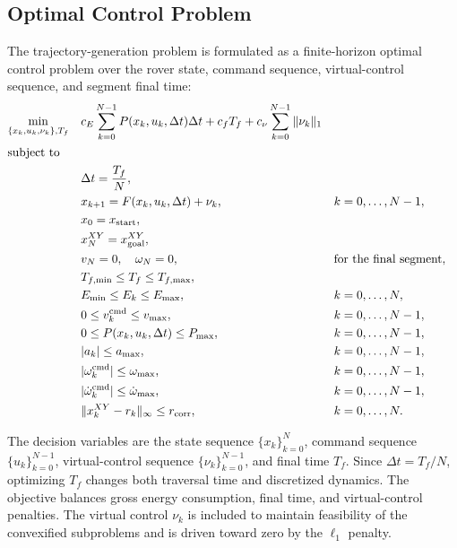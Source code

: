 \documentclass[conf]{new-aiaa}
\begin{document}
\subsection{Optimal Control Problem}
The trajectory-generation problem is formulated as a finite-horizon optimal control problem over the rover state, command sequence, virtual-control sequence, and segment final time:
\begin{subequations}\label{eq:ocp}
\begin{align}
\min_{\{x_k,u_k,\nu_k\},T_f}\quad
& c_E\sum_{k=0}^{N-1} P(x_k,u_k,\Delta t)\Delta t
 + c_f T_f
 + c_\nu\sum_{k=0}^{N-1}\|\nu_k\|_1
\label{eq:ocp_objective}\\
\intertext{subject to}
& \Delta t = \frac{T_f}{N},
\label{eq:ocp_dt}\\
& x_{k+1}=F(x_k,u_k,\Delta t)+\nu_k, && k=0,\ldots,N-1,
\label{eq:ocp_dynamics}\\
& x_0=x_{\mathrm{start}},
\label{eq:ocp_start}\\
& x_N^{XY}=x_{\mathrm{goal}}^{XY},
\label{eq:ocp_goal}\\
& v_N=0,\quad \omega_N=0, && \text{for the final segment},
\label{eq:ocp_stop}\\
& T_{f,\min}\leq T_f\leq T_{f,\max},
\label{eq:ocp_time_bounds}\\
& E_{\min}\leq E_k\leq E_{\max}, && k=0,\ldots,N,
\label{eq:ocp_energy_bounds}\\
& 0\leq v_k^{\mathrm{cmd}}\leq v_{\max}, && k=0,\ldots,N-1,
\label{eq:ocp_speed_bounds}\\
& 0\leq P(x_k,u_k,\Delta t)\leq P_{\max}, && k=0,\ldots,N-1,
\label{eq:ocp_power_bounds}\\
& |a_k|\leq a_{\max}, && k=0,\ldots,N-1,
\label{eq:ocp_accel_bound}\\
& |\omega_k^{\mathrm{cmd}}|\leq \omega_{\max}, && k=0,\ldots,N-1,
\label{eq:ocp_heading_rate_bound}\\
& |\dot{\omega}_k^{\mathrm{cmd}}|\leq \dot{\omega}_{\max}, && k=0,\ldots,N-1,
\label{eq:ocp_yaw_accel_bound}\\
& \|x_k^{XY}-r_k\|_\infty\leq r_{\mathrm{corr}}, && k=0,\ldots,N.
\label{eq:ocp_corridor}
\end{align}
\end{subequations}

The decision variables are the state sequence $\{x_k\}_{k=0}^{N}$, command sequence $\{u_k\}_{k=0}^{N-1}$, virtual-control sequence $\{\nu_k\}_{k=0}^{N-1}$, and final time $T_f$. Since $\Delta t=T_f/N$, optimizing $T_f$ changes both traversal time and discretized dynamics. The objective balances gross energy consumption, final time, and virtual-control penalties. The virtual control $\nu_k$ is included to maintain feasibility of the convexified subproblems and is driven toward zero by the $\ell_1$ penalty.
\end{document}
